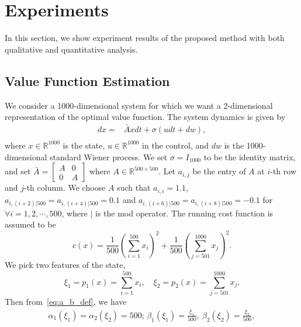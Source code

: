 \documentclass[letterpaper]{article} %
\begin{document}
\section{Experiments}
\label{sec:experiments}

In this section, we show experiment results of the proposed method with both qualitative and quantitative analysis.


\subsection{Value Function Estimation}

We consider a 1000-dimensional system for which we want a 2-dimensional representation of the optimal value function. The system dynamics is given by
\begin{equation}
\label{eq:1000d_system_experiment}
\begin{aligned}
    dx = & \bar A x dt+ \sigma ( udt + dw), \\
\end{aligned}
\end{equation}
where $x \in \mathbb{R}^{1000}$ is the state, $u \in \mathbb{R}^{1000}$ in the control, and $dw$ is the 1000-dimensional standard Wiener process. We set $\sigma = I_{1000}$ to be the identity matrix, and set $\bar A = \left[\begin{array}{l|l}
A & 0 \\
\hline 0 & A
\end{array}\right]$ where $A \in \mathbb{R}^{500 \times 500}$. Let $a_{i,j}$ be the entry of $A$ at $i$-th row and $j$-th column. We choose $A$ such that $a_{i,i} = 1.1$, $a_{i,(i+2) | 500} = a_{i,(i+4) | 500} = 0.1$ and $a_{i,(i+6) | 500} = a_{i,(i+8) | 500} = -0.1$ for $\forall i = 1,2, \cdots, 500$, where $|$ is the mod operator. The running cost function is assumed to be
\begin{equation}
\label{eq:1000d_system_experiment_cost}
    c(x) =
    \frac{1}{500}(\sum_{i=1}^{500} x_i)^2 + \frac{1}{500}(\sum_{j=501}^{1000}{x_j})^2.
\end{equation}
We pick two features of the state,
\begin{equation}
\label{eq:1000d_features}
    \xi_1 = p_1(x) = \sum_{i=1}^{500} x_i, \quad \xi_2 = p_2(x) = \sum_{j=501}^{1000} x_j.
\end{equation}
Then from~\eqref{eq:a_b_def}, we have
\begin{equation}
\label{eq:1000d_alpha_beta}
\begin{aligned}
    \alpha_1(\xi_1) = \alpha_2(\xi_2) = 500; \, \beta_1(\xi_1) = \frac{\xi_1}{500}, \ \beta_2(\xi_2) = \frac{\xi_2}{500},
\end{aligned}
\end{equation}
\end{document}
